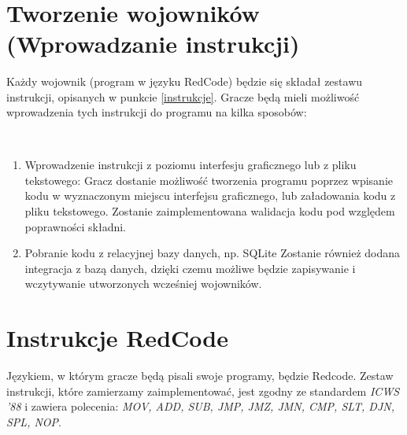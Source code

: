 \

\section{Tworzenie wojowników (Wprowadzanie instrukcji)}
Każdy wojownik (program w języku RedCode) będzie się składał zestawu instrukcji, opisanych w punkcie \ref{instrukcje}. Gracze będą mieli możliwość wprowadzenia tych instrukcji do programu na kilka sposobów:

\
\begin{enumerate}
	\item Wprowadzenie instrukcji z poziomu interfesju graficznego lub z pliku tekstowego:
	\newline
		Gracz dostanie możliwość tworzenia programu poprzez wpisanie kodu w wyznaczonym miejscu interfejsu graficznego, lub załadowania kodu z pliku tekstowego. Zostanie zaimplementowana walidacja kodu pod względem poprawności składni.
	
	\item Pobranie kodu z relacyjnej bazy danych, np. SQLite
	\newline
		Zostanie również dodana integracja z bazą danych, dzięki czemu możliwe będzie 	zapisywanie i wczytywanie utworzonych wcześniej wojowników.

\end{enumerate}

\section{Instrukcje RedCode}
Językiem, w którym gracze będą pisali swoje programy, będzie Redcode. Zestaw instrukcji, które zamierzamy zaimplementować, jest zgodny ze standardem \textit{ICWS '88} i zawiera polecenia: \textit{MOV, ADD, SUB, JMP, JMZ, JMN, CMP, SLT, DJN, SPL, NOP}.
\label{instrukcje}